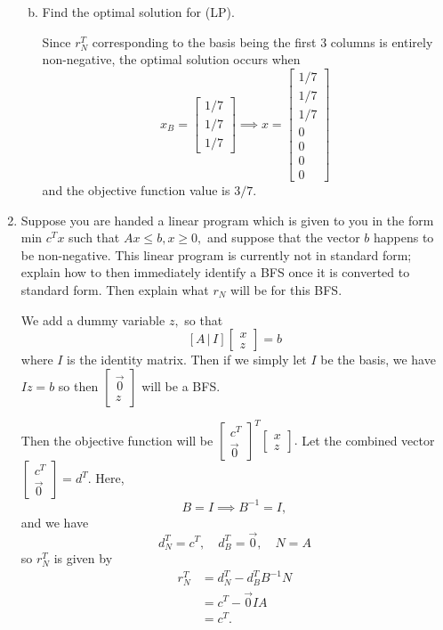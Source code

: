 \documentclass{article}
\begin{document}
\begin{enumerate}
\begin{enumerate}[a)]
\begin{soln}
				\end{soln}

			\item Find the optimal solution for (LP).
				\begin{soln}
					Since $r_N^T$ corresponding to the basis being the first 3 columns is entirely non-negative, the optimal solution occurs when \[x_B=\begin{bmatrix}
						1/7 \\ 1/7 \\ 1/7
					\end{bmatrix} \implies x=\begin{bmatrix}
					1/7 \\ 1/7 \\ 1/7 \\ 0 \\ 0 \\ 0 \\ 0
			\end{bmatrix} \] and the objective function value is $3/7.$

				\end{soln}
				
		\end{enumerate}

	\item Suppose you are handed a linear program which is given to you in the form min $c^T x$ such that $Ax\le b, x\ge 0,$ and suppose that the vector $b$ happens to be non-negative. This linear program is currently not in standard form; explain how to then immediately identify a BFS once it is converted to standard form. Then explain what $r_N$ will be for this BFS.
		\begin{soln}
			We add a dummy variable $z,$ so that \[ [A\, |\, I] \begin{bmatrix}
				x \\ z
		\end{bmatrix} = b\] where $I$ is the identity matrix. Then if we simply let $I$ be the basis, we have $Iz=b$ so then $\begin{bmatrix}
			\vec{0} \\ z
		\end{bmatrix}$ will be a BFS. 

		Then the objective function will be $\begin{bmatrix}
			c^T \\ \vec{0}
		\end{bmatrix}^T\begin{bmatrix}
			x \\ z
		\end{bmatrix}.$ Let the combined vector $\begin{bmatrix}
			c^T \\ \vec{0}
		\end{bmatrix}=d^T.$ Here, \[B=I\implies B^{-1}=I, \] and we have \[d_N^T = c^T, \quad d_B^T = \vec{0}, \quad N=A\]
		so $r_N^T$ is given by 
		\begin{align*}
			r_N^T &= d_N^T - d_B^T B^{-1}N \\
			&= c^T-\vec{0}IA \\
			&= c^T.
		\end{align*}


\end{soln}
\end{enumerate}
\end{document}
